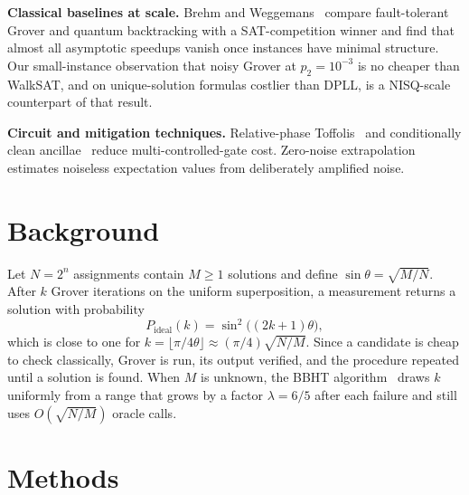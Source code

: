 \documentclass[conference]{IEEEtran}
\begin{document}
\textbf{Classical baselines at scale.} Brehm and Weggemans~\cite{brehm2026} compare fault-tolerant Grover and quantum backtracking with a SAT-competition winner and find that almost all asymptotic speedups vanish once instances have minimal structure. Our small-instance observation that noisy Grover at $p_2=10^{-3}$ is no cheaper than WalkSAT, and on unique-solution formulas costlier than DPLL, is a NISQ-scale counterpart of that result.

\textbf{Circuit and mitigation techniques.} Relative-phase Toffolis~\cite{maslov2016} and conditionally clean ancillae~\cite{khattar2025} reduce multi-controlled-gate cost. Zero-noise extrapolation~\cite{temme2017,giurgica2020} estimates noiseless expectation values from deliberately amplified noise.

\section{Background}

Let $N=2^n$ assignments contain $M\ge1$ solutions and define $\sin\theta=\sqrt{M/N}$. After $k$ Grover iterations on the uniform superposition, a measurement returns a solution with probability~\cite{bbht1998,nielsen2010}
\begin{equation}
P_\text{ideal}(k) = \sin^2\!\big((2k+1)\theta\big),
\end{equation}
which is close to one for $k=\lfloor\pi/4\theta\rfloor \approx (\pi/4)\sqrt{N/M}$. Since a candidate is cheap to check classically, Grover is run, its output verified, and the procedure repeated until a solution is found. When $M$ is unknown, the BBHT algorithm~\cite{bbht1998} draws $k$ uniformly from a range that grows by a factor $\lambda=6/5$ after each failure and still uses $O(\sqrt{N/M})$ oracle calls.

\section{Methods}
\end{document}
